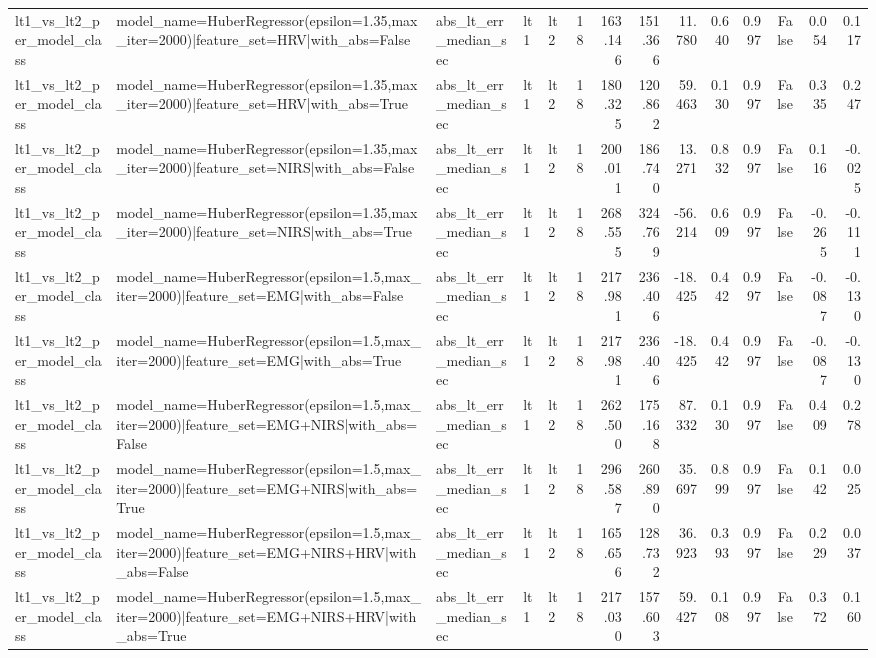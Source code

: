 \begin{table}
\begin{tabular}{lllllrrrrrrrrr}
lt1_vs_lt2_per_model_class & model_name=HuberRegressor(epsilon=1.35,max_iter=2000)|feature_set=HRV|with_abs=False & abs_lt_err_median_sec & lt1 & lt2 & 18 & 163.146 & 151.366 & 11.780 & 0.640 & 0.997 & False & 0.054 & 0.117 \\
lt1_vs_lt2_per_model_class & model_name=HuberRegressor(epsilon=1.35,max_iter=2000)|feature_set=HRV|with_abs=True & abs_lt_err_median_sec & lt1 & lt2 & 18 & 180.325 & 120.862 & 59.463 & 0.130 & 0.997 & False & 0.335 & 0.247 \\
lt1_vs_lt2_per_model_class & model_name=HuberRegressor(epsilon=1.35,max_iter=2000)|feature_set=NIRS|with_abs=False & abs_lt_err_median_sec & lt1 & lt2 & 18 & 200.011 & 186.740 & 13.271 & 0.832 & 0.997 & False & 0.116 & -0.025 \\
lt1_vs_lt2_per_model_class & model_name=HuberRegressor(epsilon=1.35,max_iter=2000)|feature_set=NIRS|with_abs=True & abs_lt_err_median_sec & lt1 & lt2 & 18 & 268.555 & 324.769 & -56.214 & 0.609 & 0.997 & False & -0.265 & -0.111 \\
lt1_vs_lt2_per_model_class & model_name=HuberRegressor(epsilon=1.5,max_iter=2000)|feature_set=EMG|with_abs=False & abs_lt_err_median_sec & lt1 & lt2 & 18 & 217.981 & 236.406 & -18.425 & 0.442 & 0.997 & False & -0.087 & -0.130 \\
lt1_vs_lt2_per_model_class & model_name=HuberRegressor(epsilon=1.5,max_iter=2000)|feature_set=EMG|with_abs=True & abs_lt_err_median_sec & lt1 & lt2 & 18 & 217.981 & 236.406 & -18.425 & 0.442 & 0.997 & False & -0.087 & -0.130 \\
lt1_vs_lt2_per_model_class & model_name=HuberRegressor(epsilon=1.5,max_iter=2000)|feature_set=EMG+NIRS|with_abs=False & abs_lt_err_median_sec & lt1 & lt2 & 18 & 262.500 & 175.168 & 87.332 & 0.130 & 0.997 & False & 0.409 & 0.278 \\
lt1_vs_lt2_per_model_class & model_name=HuberRegressor(epsilon=1.5,max_iter=2000)|feature_set=EMG+NIRS|with_abs=True & abs_lt_err_median_sec & lt1 & lt2 & 18 & 296.587 & 260.890 & 35.697 & 0.899 & 0.997 & False & 0.142 & 0.025 \\
lt1_vs_lt2_per_model_class & model_name=HuberRegressor(epsilon=1.5,max_iter=2000)|feature_set=EMG+NIRS+HRV|with_abs=False & abs_lt_err_median_sec & lt1 & lt2 & 18 & 165.656 & 128.732 & 36.923 & 0.393 & 0.997 & False & 0.229 & 0.037 \\
lt1_vs_lt2_per_model_class & model_name=HuberRegressor(epsilon=1.5,max_iter=2000)|feature_set=EMG+NIRS+HRV|with_abs=True & abs_lt_err_median_sec & lt1 & lt2 & 18 & 217.030 & 157.603 & 59.427 & 0.108 & 0.997 & False & 0.372 & 0.160 \\

\end{tabular}
\end{table}
